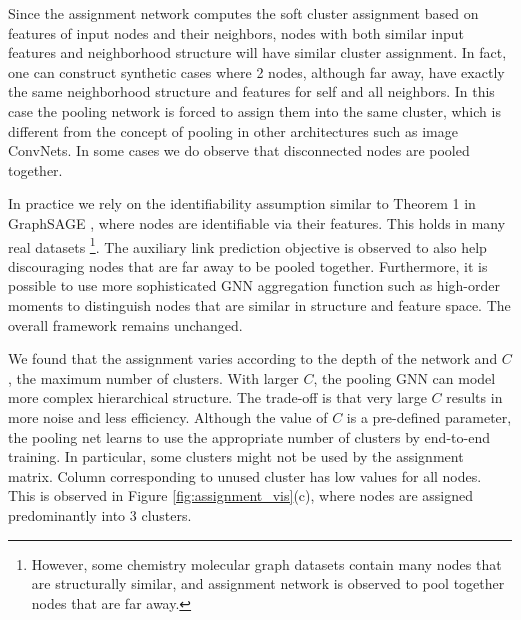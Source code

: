 Since the assignment network computes the soft cluster assignment based on features of input nodes and their neighbors, nodes with both similar input features and neighborhood structure will have similar cluster assignment.
In fact, one can construct synthetic cases where 2 nodes, although far away, have exactly the same neighborhood structure and features for self and all neighbors. In this case the pooling network is forced to assign them into the same cluster, which is different from the concept of pooling in other architectures such as image ConvNets. In some cases we do observe that disconnected nodes are pooled together.

In practice we rely on the identifiability assumption similar to Theorem 1 in GraphSAGE \cite{hamilton2017inductive}, where nodes are identifiable via their features. This holds in many real datasets \footnote{However, some chemistry molecular graph datasets contain many nodes that are structurally similar, and assignment network is observed to pool together nodes that are far away.}. 
The auxiliary link prediction objective is observed to also help discouraging nodes that are far away to be pooled together. Furthermore, it is possible to use more sophisticated GNN aggregation function such as high-order moments \cite{verma2018graph} to distinguish nodes that are similar in structure and feature space. The overall framework remains unchanged.

We found that the assignment varies according to the depth of the network and $C$, the maximum number of clusters. With larger $C$, the pooling GNN can model more complex hierarchical structure. The trade-off is that very large $C$ results in more noise and less efficiency. 
Although the value of $C$ is a pre-defined parameter, the pooling net learns to use the appropriate number of clusters by end-to-end training. 
In particular, some clusters might not be used by the assignment matrix. Column corresponding to unused cluster has low values for all nodes. This is observed in Figure \ref{fig:assignment_vis}(c), where nodes are assigned predominantly into 3 clusters.


